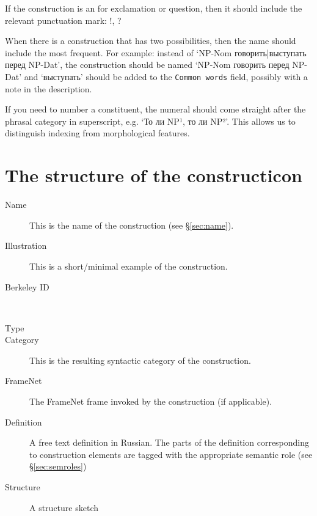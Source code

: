 \documentclass[a4paper,11pt, onecolumn,twoside]{article}
\begin{document}
If the construction is an for exclamation or question, then it should include the 
relevant punctuation mark: !, ?

When there is a construction that has two possibilities, then the name should 
include the most frequent. For example: instead of `NP-Nom говорить|выступать перед NP-Dat',
the construction should be named `NP-Nom говорить перед NP-Dat' and `выступать' should
be added to the \texttt{Common words} field, possibly with a note in the description.

If you need to number a constituent, the numeral should come straight after the phrasal
category in superscript, e.g. `То ли NP¹, то ли NP²'. This allows us to distinguish indexing
from morphological features.

\section{The structure of the constructicon}

\begin{description}
  \item[Name] This is the name of the construction (see §\ref{sec:name}).
  \item[Illustration] This is a short/minimal example of the construction.
  \item[Berkeley ID] ~
  \item[Type]
  \item[Category] This is the resulting syntactic category of the construction.
  \item[FrameNet] The FrameNet frame invoked by the construction (if applicable).
  \item[Definition] A free text definition in Russian. The parts of the definition 
      corresponding to construction elements are tagged with the appropriate semantic role (see §\ref{sec:semroles})
  \item[Structure] A structure sketch
\end{description}



% 
\end{document}
